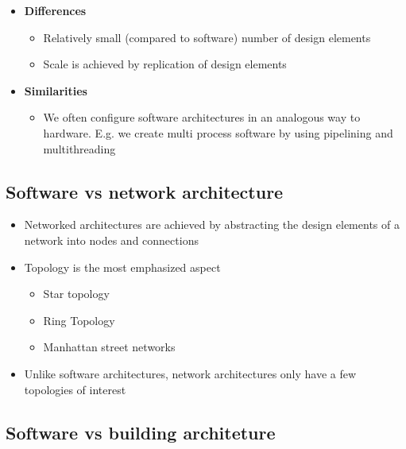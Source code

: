 \documentclass[12pt]{book}
\begin{document}
\begin{itemize}
    \item \textbf{Differences}
    \begin{itemize}
        \item Relatively small (compared to software) number of design elements
        \item Scale is achieved by replication of design elements
    \end{itemize} 

    \item \textbf{Similarities}
    \begin{itemize}
        \item We often configure software architectures in an analogous way to hardware. E.g. we create multi process software by using pipelining and multithreading
    \end{itemize}
\end{itemize}

\subsection{Software vs network architecture}

\begin{itemize}
    \item Networked architectures are achieved by abstracting the design elements of a network into nodes and connections
    \item Topology is the most emphasized aspect
    \begin{itemize}
        \item Star topology
        \item Ring Topology
        \item Manhattan street networks
    \end{itemize}

    \item Unlike software architectures, network architectures only have a few topologies of interest
\end{itemize}

\subsection{Software vs building architeture}
\end{document}
